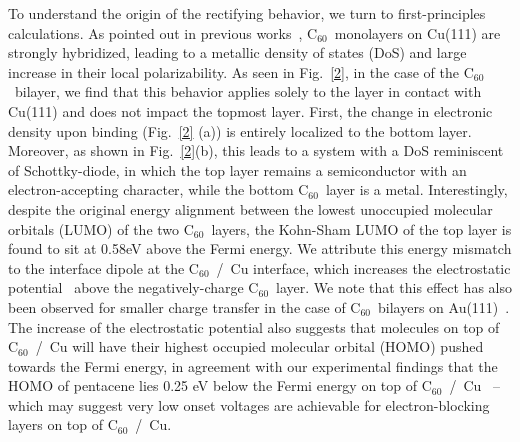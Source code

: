 \documentclass[11pt,showpacs,amsmath,amssymbl]{revtex4}
\newcommand{\buck}{C$_{60}$~}
\begin{document}
To understand the origin of the rectifying behavior, we turn to first-principles calculations. As pointed out in previous works~\cite{wang2004rotation,Pai:2004bc, Pai:2010dx},  \buck monolayers on Cu(111) are strongly hybridized, leading to a metallic density of states (DoS) and large increase in their local polarizability. 
As seen in Fig.~\ref{2}, in the case of the \buck bilayer, we find that this behavior applies solely to the layer in contact with Cu(111) and does not impact the topmost layer. First, the change in electronic density upon binding (Fig.~\ref{2} (a)) is entirely localized to the bottom layer. Moreover, as shown in Fig.~\ref{2}(b), this leads to a system with a DoS reminiscent of Schottky-diode, in which the top layer remains a semiconductor with an electron-accepting character, while the bottom \buck layer is a metal. Interestingly, despite the original energy alignment between the lowest unoccupied molecular orbitals (LUMO) of the two \buck layers, the Kohn-Sham LUMO of the top layer is found to sit at 0.58eV above the Fermi energy. We attribute this energy mismatch to the interface dipole at the \buck /~Cu interface, which increases the electrostatic potential~\cite{natan,selloni} above the negatively-charge \buck layer. We note that this effect has also been observed for smaller charge transfer in the case of \buck bilayers on Au(111)~\cite{GrobisCrommie,geng2012}. The increase of the electrostatic potential also suggests that molecules on top of \buck /~Cu will have their highest occupied molecular orbital (HOMO) pushed towards the Fermi energy, in agreement with our experimental findings that the HOMO of pentacene lies 0.25 eV below the Fermi energy on top of \buck/~Cu~\cite{smerdon2016large} -- which may suggest very low onset voltages are achievable for electron-blocking layers on top of \buck/~Cu. 
\end{document}
